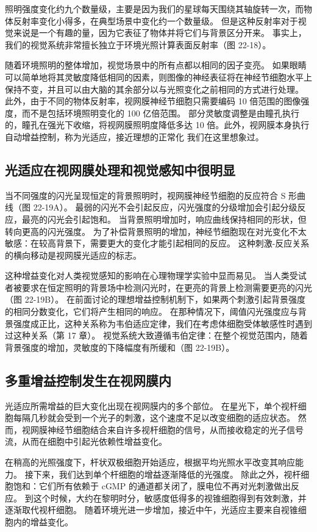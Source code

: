 照明强度变化约九个数量级，主要是因为我们的星球每天围绕其轴旋转一次，而物体反射率变化小得多，在典型场景中变化约一个数量级。 但是这种反射率对于视觉来说是一个有趣的量，因为它表征了物体并将它们与背景区分开来。 事实上，我们的视觉系统非常擅长独立于环境光照计算表面反射率（图 22-18）。

随着环境照明的整体增加，视觉场景中的所有点都以相同的因子变亮。 如果眼睛可以简单地将其灵敏度降低相同的因素，则图像的神经表征将在神经节细胞水平上保持不变，并且可以由大脑的其余部分以与光照变化之前相同的方式进行处理。 此外，由于不同的物体反射率，视网膜神经节细胞只需要编码 10 倍范围的图像强度，而不是包括环境照明变化的 100 亿倍范围。 部分灵敏度调整是由瞳孔执行的，瞳孔在强光下收缩，将视网膜照明度降低多达 10 倍。此外，视网膜本身执行自动增益控制，称为光适应，接近理想的正常化 我们在这里想象过。

\subsection{光适应在视网膜处理和视觉感知中很明显}
当不同强度的闪光呈现恒定的背景照明时，视网膜神经节细胞的反应符合 S 形曲线（图 22-19A）。 最弱的闪光不会引起反应，闪光强度的分级增加会引起分级反应，最亮的闪光会引起饱和。 当背景照明增加时，响应曲线保持相同的形状，但转向更高的闪光强度。 为了补偿背景照明的增加，神经节细胞现在对光变化不太敏感：在较高背景下，需要更大的变化才能引起相同的反应。 这种刺激-反应关系的横向移动是视网膜光适应的标志。

这种增益变化对人类视觉感知的影响在心理物理学实验中显而易见。 当人类受试者被要求在恒定照明的背景场中检测闪光时，在更亮的背景上检测需要更亮的闪光（图 22-19B）。 在前面讨论的理想增益控制机制下，如果两个刺激引起背景强度的相同分数变化，它们将产生相同的响应。 在那种情况下，阈值闪光强度应与背景强度成正比，这种关系称为韦伯适应定律，我们在考虑体细胞受体敏感性时遇到过这种关系（第 17 章）。 视觉系统大致遵循韦伯定律：在整个视觉范围内，随着背景强度的增加，灵敏度的下降幅度有所缓和（图 22-19B）。

\subsection{多重增益控制发生在视网膜内}
光适应所需增益的巨大变化出现在视网膜内的多个部位。 在星光下，单个视杆细胞每隔几秒就会受到一个光子的刺激，这个速度不足以改变细胞的适应状态。 然而，视网膜神经节细胞结合来自许多视杆细胞的信号，从而接收稳定的光子信号流，从而在细胞中引起光依赖性增益变化。

在稍高的光照强度下，杆状双极细胞开始适应，根据平均光照水平改变其响应能力。 接下来，我们达到单个杆细胞的增益逐渐降低的光强度。 除此之外，视杆细胞饱和：它们所有依赖于 cGMP 的通道都关闭了，膜电位不再对光刺激做出反应。 到这个时候，大约在黎明时分，敏感度低得多的视锥细胞得到有效刺激，并逐渐取代视杆细胞。 随着环境光进一步增加，接近中午，光适应主要来自视锥细胞内的增益变化。

